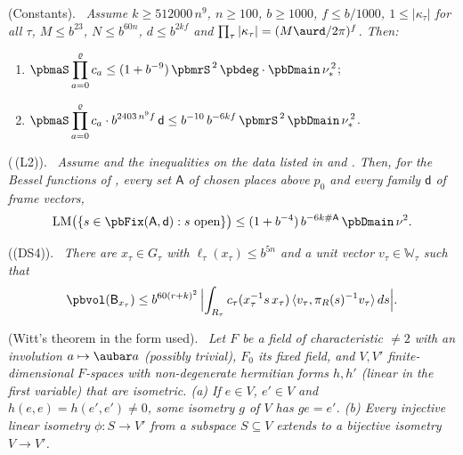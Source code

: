 \documentclass[10pt]{amsart}
\theoremstyle{definition}
\theoremstyle{remark}
\providecommand{\pbLM}{\mathrm{LM}}
\providecommand{\pbW}{\mathbb W}
\providecommand{\pbeB}{\mathsf B}
\providecommand{\pbel}{\ell}
\providecommand{\pbip}[2]{\langle#1,#2\rangle}
\providecommand{\pbmdec}{\mathsf d}
\providecommand{\pbmnuS}{\nu_*}
\newenvironment{quotedthm}[2]{\par\medskip\noindent\begingroup
  \textbf{#1}#2.\ \itshape\ignorespaces}{\endgroup\par\medskip}
\begin{document}
\begin{quotedthm}{\cite[Lemma~3.52]{P51}}{ (Constants)}
Assume $k\ge512000\,n^9$, $n\ge100$, $b\ge1000$, $f\le b/1000$, $1\le|\kappa_\tau|$ for all
$\tau$, $M\le b^{23}$, $N\le b^{60n}$, $d\le b^{2kf}$ and $\prod_\tau|\kappa_\tau|=(M\aurd/2\pi)^f$.
Then:
\begin{enumerate}
\item[(C0)] $\displaystyle\pbmaS\prod_{a=0}^{\varrho}c_a\le(1+b^{-9})\,\pbmrS^{\,2}\,\pbdeg\cdot\pbDmain\,
\pbmnuS^{\,2}$;
\item[(C1)] $\displaystyle\pbmaS\prod_{a=0}^{\varrho}c_a\cdot b^{2403\,n^9f}\,\pbmdec\le b^{-10}\,b^{-6kf}\,
\pbmrS^{\,2}\,\pbDmain\,\pbmnuS^{\,2}$.
\end{enumerate}
\end{quotedthm}

\begin{quotedthm}{\cite[Theorem~3.53]{P51}}{ ({\cite[Theorem~2.23]{P51}}\,\textup{(L2)})}
Assume {\cite[Theorem~3.51]{P51}} and the inequalities on the data listed in {\cite[Theorem~3.50]{P51}}
and {\cite[Lemma~3.52]{P51}}. Then, for the Bessel functions of {\cite[Theorem~3.51]{P51}}, every set
$\mathsf A$ of chosen places above $p_0$ and every family $\mathsf d$ of frame vectors,
\[
\pbLM\bigl(\{s\in\pbFix(\mathsf A,\mathsf d):s\text{ open}\}\bigr)\le(1+b^{-4})\,b^{-6k\#\mathsf A}\,\pbDmain
\,\nu^2 .
\]
\end{quotedthm}

\begin{quotedthm}{\cite[Theorem~7.2]{P51}}{ (\textup{(DS4)})}
There are $x_\tau\in G_\tau$ with $\pbel_\tau(x_\tau)\le b^{5n}$ and a unit vector $v_\tau\in
\pbW_\tau$ such that
\[
\pbvol(\pbeB_{x_\tau})\le b^{60(r+k)^2}\,\Bigl|\int_{R_\tau}c_\tau(x_\tau^{-1}s\,x_\tau)\,
\pbip{v_\tau}{\pi_R(s)^{-1}v_\tau}\,ds\Bigr| .
\]
\end{quotedthm}

\begin{quotedthm}{\cite[Lemma~7.12]{P51}}{ (Witt's theorem in the form used)}
Let $F$ be a field of characteristic $\ne2$ with an involution $a\mapsto\aubar a$ \textup(possibly
trivial\textup), $F_0$ its fixed field, and $V,V'$ finite-dimensional $F$-spaces with non-degenerate
hermitian forms $h,h'$ \textup(linear in the first variable\textup) that are isometric.
\textup{(a)} If $e\in V$, $e'\in V$ and $h(e,e)=h(e',e')\ne0$, some isometry $g$ of $V$ has $ge=e'$.
\textup{(b)} Every injective linear isometry $\phi\colon S\to V'$ from a subspace $S\subseteq V$ extends to
a bijective isometry $V\to V'$.
\end{quotedthm}
\end{document}

